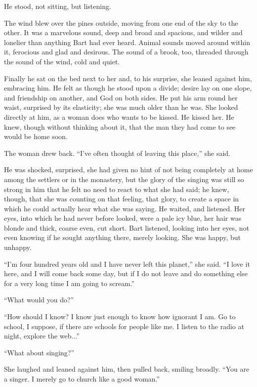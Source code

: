 \documentclass[english,11pt,letterpaper,onecolumn]{scrbook}
\begin{document}
	He stood, not sitting, but listening.

	The wind blew over the pines outside, moving from one end of the sky to the other.  It was a marvelous sound, deep and broad and spacious, and wilder and lonelier than anything Bart had ever heard.  Animal sounds moved around within it, ferocious and glad and desirous.  The sound of a brook, too, threaded through the sound of the wind, cold and quiet.

	Finally he sat on the bed next to her and, to his surprise, she leaned against him, embracing him.  He felt as though he stood upon a divide; desire lay on one slope, and friendship on another, and God on both sides.  He put his arm round her waist, surprised by its elasticity; she was much older than he was. She looked directly at him, as a woman does who wants to be kissed.  He kissed her.  He knew, though without thinking about it, that the man they had come to see would be home soon.

	The woman drew back. ``I've often thought of leaving this place,'' she said.

	He was shocked, surprised, she had given no hint of not being completely at home among the settlers or in the monastery, but the glory of the singing was still so strong in him that he felt no need to react to what she had said; he knew, though, that she was counting on that feeling, that glory, to create a space in which he could actually hear what she was saying.  He waited, and listened.  Her eyes, into which he had never before looked, were a pale icy blue, her hair was blonde and thick, coarse even, cut short.  Bart listened, looking into her eyes, not even knowing if he sought anything there, merely looking.  She was happy, but unhappy.

	``I'm four hundred years old and I have never left this planet,'' she said.  ``I love it here, and I will come back some day, but if I do not leave and do something else for a very long time I am going to scream.''

	``What would you do?''

	``How should I know?  I know just enough to know how ignorant I am.  Go to school, I suppose, if there are schools for people like me.  I listen to the radio at night, explore the web...''

	``What about singing?''

	She laughed and leaned against him, then pulled back, smiling broadly.  ``You are a singer.  I merely go to church like a good woman.''
\end{document}

